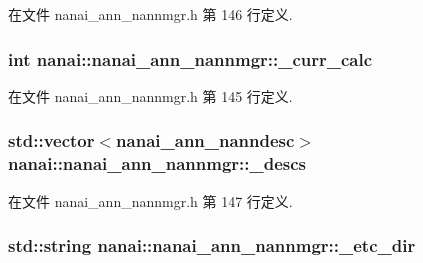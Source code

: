 在文件 nanai\+\_\+ann\+\_\+nannmgr.\+h 第 146 行定义.

\hypertarget{classnanai_1_1nanai__ann__nannmgr_a8531ad0d6391af0c318f286b44fd0604}{}
\subsubsection[{\+\_\+curr\+\_\+calc}]{\setlength{\rightskip}{0pt plus 5cm}int nanai\+::nanai\+\_\+ann\+\_\+nannmgr\+::\+\_\+curr\+\_\+calc\hspace{0.3cm}{\ttfamily [protected]}}\label{classnanai_1_1nanai__ann__nannmgr_a8531ad0d6391af0c318f286b44fd0604}


在文件 nanai\+\_\+ann\+\_\+nannmgr.\+h 第 145 行定义.

\hypertarget{classnanai_1_1nanai__ann__nannmgr_a4ffd16017f8b8a0aa6dbd0c3210c13d2}{}
\subsubsection[{\+\_\+descs}]{\setlength{\rightskip}{0pt plus 5cm}std\+::vector$<${\bf nanai\+\_\+ann\+\_\+nanndesc}$>$ nanai\+::nanai\+\_\+ann\+\_\+nannmgr\+::\+\_\+descs\hspace{0.3cm}{\ttfamily [protected]}}\label{classnanai_1_1nanai__ann__nannmgr_a4ffd16017f8b8a0aa6dbd0c3210c13d2}


在文件 nanai\+\_\+ann\+\_\+nannmgr.\+h 第 147 行定义.

\hypertarget{classnanai_1_1nanai__ann__nannmgr_a0da1bf8be2e30b97f5414dbba84a9e4c}{}
\subsubsection[{\+\_\+etc\+\_\+dir}]{\setlength{\rightskip}{0pt plus 5cm}std\+::string nanai\+::nanai\+\_\+ann\+\_\+nannmgr\+::\+\_\+etc\+\_\+dir\hspace{0.3cm}{\ttfamily [protected]}}\label{classnanai_1_1nanai__ann__nannmgr_a0da1bf8be2e30b97f5414dbba84a9e4c}


